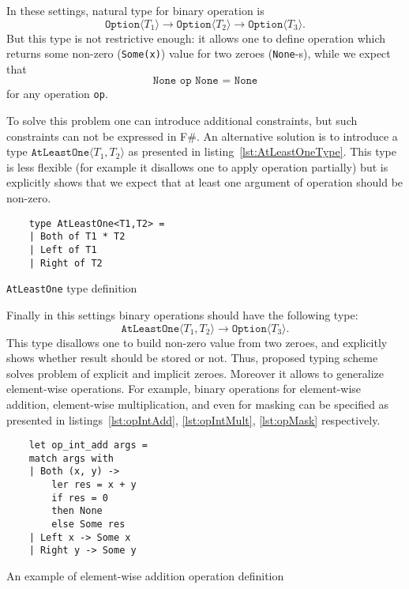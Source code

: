 In these settings, natural type for binary operation is $$\texttt{Option}\langle T_1 \rangle \to \texttt{Option}\langle T_2 \rangle \to \texttt{Option}\langle T_3 \rangle.$$ But this type is not restrictive enough: it allows one to define operation which returns some non-zero (\texttt{Some(x)}) value for two zeroes (\texttt{None}-s), while we expect that $$\texttt{None op None = None}$$ for any operation \texttt{op}.   

To solve this problem one can introduce additional constraints, but such constraints can not be expressed in F\#.
An alternative solution is to introduce a type $\texttt{AtLeastOne} \langle T_1, T_2 \rangle$ as presented in listing~\ref{lst:AtLeastOneType}. This type is less flexible (for example it disallows one to apply operation partially) but is explicitly shows that we expect that at least one argument of operation should be non-zero. 

\begin{listing}[h]
    \begin{verbatim}
    type AtLeastOne<T1,T2> =
    | Both of T1 * T2
    | Left of T1
    | Right of T2
    \end{verbatim}
    \caption{\texttt{AtLeastOne} type definition}
    \label{lst:AtLeastOneType}
\end{listing}

Finally in this settings binary operations should have the following type: $$\texttt{AtLeastOne} \langle T_1, T_2 \rangle \to \texttt{Option}\langle T_3 \rangle.$$
This type disallows one to build non-zero value from two zeroes, and explicitly shows whether result should be stored or not.
Thus, proposed typing scheme solves problem of explicit and implicit zeroes.
Moreover it allows to generalize element-wise operations.
For example, binary operations for element-wise addition, element-wise multiplication, and even for masking can be specified as presented in listings~\ref{lst:opIntAdd}, \ref{lst:opIntMult}, \ref{lst:opMask} respectively.

\begin{listing}[h]
    \begin{verbatim}
    let op_int_add args =
    match args with
    | Both (x, y) -> 
        ler res = x + y 
        if res = 0 
        then None 
        else Some res 
    | Left x -> Some x
    | Right y -> Some y
    \end{verbatim}
    \caption{An example of element-wise addition operation definition}
    \label{lst:opIntAdd}
\end{listing}

